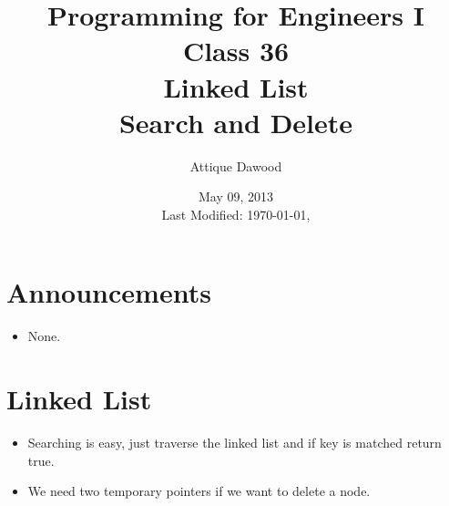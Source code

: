 \documentclass[12pt,a4paper]{article}
\title{\vspace{-2cm}Programming for Engineers I\\Class 36\\Linked List\\Search and Delete}
\author{Attique Dawood}
\date{May 09, 2013\\[0.2cm] Last Modified: \today, \currenttime}
\begin{document}
\maketitle
\section{Announcements}
\begin{itemize}
\item None.
\end{itemize}
\section{Linked List}
\begin{itemize}
\item Searching is easy, just traverse the linked list and if key is matched return true.
\item We need two temporary pointers if we want to delete a node.
\end{itemize}
\end{document}
